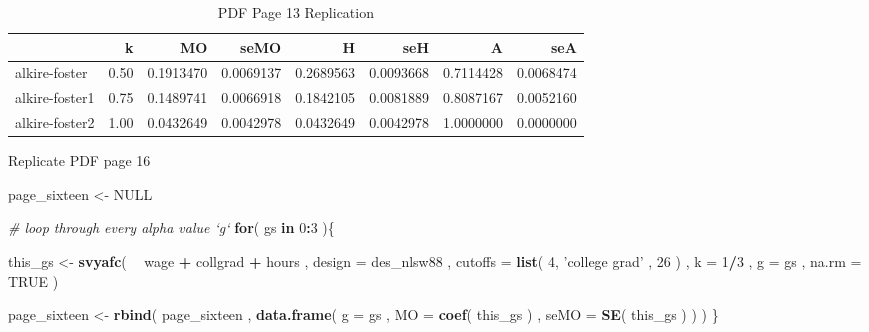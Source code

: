 \documentclass[]{book}
\newenvironment{Shaded}{\begin{snugshade}}{\end{snugshade}}
\newcommand{\CommentTok}[1]{\textcolor[rgb]{0.56,0.35,0.01}{\textit{#1}}}
\newcommand{\ControlFlowTok}[1]{\textcolor[rgb]{0.13,0.29,0.53}{\textbf{#1}}}
\newcommand{\DataTypeTok}[1]{\textcolor[rgb]{0.13,0.29,0.53}{#1}}
\newcommand{\DecValTok}[1]{\textcolor[rgb]{0.00,0.00,0.81}{#1}}
\newcommand{\KeywordTok}[1]{\textcolor[rgb]{0.13,0.29,0.53}{\textbf{#1}}}
\newcommand{\NormalTok}[1]{#1}
\newcommand{\OperatorTok}[1]{\textcolor[rgb]{0.81,0.36,0.00}{\textbf{#1}}}
\newcommand{\OtherTok}[1]{\textcolor[rgb]{0.56,0.35,0.01}{#1}}
\newcommand{\StringTok}[1]{\textcolor[rgb]{0.31,0.60,0.02}{#1}}
\begin{document}
\begin{table}

\caption{\label{tab:unnamed-chunk-61}PDF Page 13 Replication}
\centering
\begin{tabular}[t]{lrrrrrrr}
\toprule
  & k & MO & seMO & H & seH & A & seA\\
\midrule
alkire-foster & 0.50 & 0.1913470 & 0.0069137 & 0.2689563 & 0.0093668 & 0.7114428 & 0.0068474\\
alkire-foster1 & 0.75 & 0.1489741 & 0.0066918 & 0.1842105 & 0.0081889 & 0.8087167 & 0.0052160\\
alkire-foster2 & 1.00 & 0.0432649 & 0.0042978 & 0.0432649 & 0.0042978 & 1.0000000 & 0.0000000\\
\bottomrule
\end{tabular}
\end{table}

Replicate PDF page 16

\begin{Shaded}
\begin{Highlighting}[]
\NormalTok{page_sixteen <-}\StringTok{ }\OtherTok{NULL}

\CommentTok{# loop through every alpha value `g`}
\ControlFlowTok{for}\NormalTok{( gs }\ControlFlowTok{in} \DecValTok{0}\OperatorTok{:}\DecValTok{3}\NormalTok{ )\{}
    
\NormalTok{    this_gs <-}
\StringTok{        }\KeywordTok{svyafc}\NormalTok{(}
        \OperatorTok{~}\StringTok{ }\NormalTok{wage }\OperatorTok{+}\StringTok{ }\NormalTok{collgrad }\OperatorTok{+}\StringTok{ }\NormalTok{hours , }
        \DataTypeTok{design =}\NormalTok{ des_nlsw88 , }
        \DataTypeTok{cutoffs =} \KeywordTok{list}\NormalTok{( }\DecValTok{4}\NormalTok{, }\StringTok{'college grad'}\NormalTok{ , }\DecValTok{26}\NormalTok{ ) , }
        \DataTypeTok{k =} \DecValTok{1}\OperatorTok{/}\DecValTok{3}\NormalTok{ , }
        \DataTypeTok{g =}\NormalTok{ gs , }
        \DataTypeTok{na.rm =} \OtherTok{TRUE}
\NormalTok{      )}
    
\NormalTok{    page_sixteen <-}
\StringTok{        }\KeywordTok{rbind}\NormalTok{(}
\NormalTok{            page_sixteen ,}
            \KeywordTok{data.frame}\NormalTok{( }
                \DataTypeTok{g =}\NormalTok{ gs , }
                \DataTypeTok{MO =} \KeywordTok{coef}\NormalTok{( this_gs ) ,}
                \DataTypeTok{seMO =} \KeywordTok{SE}\NormalTok{( this_gs ) }
\NormalTok{          )}
\NormalTok{        )}
\NormalTok{\}}
\end{Highlighting}
\end{Shaded}
\end{document}
